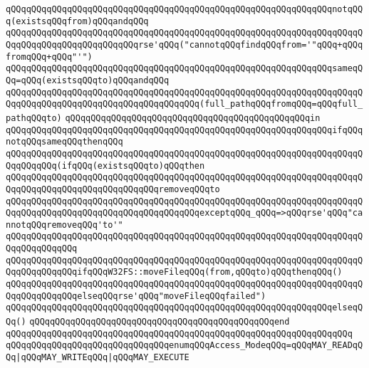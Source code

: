 \verb|qQQqqQQqqQQqqQQqqQQqqQQqqQQqqQQqqQQqqQQqqQQqqQQqqQQqqQQqqQQqqQQqnotqQQq(existsqQQqfrom)qQQqandqQQq|\newline
\verb|qQQqqQQqqQQqqQQqqQQqqQQqqQQqqQQqqQQqqQQqqQQqqQQqqQQqqQQqqQQqqQQqqQQqqQQqqQQqqQQqqQQqqQQqqQQqqQQqrse'qQQq("cannotqQQqfindqQQqfrom='"qQQq+qQQqfromqQQq+qQQq"'")|\newline
\verb|qQQqqQQqqQQqqQQqqQQqqQQqqQQqqQQqqQQqqQQqqQQqqQQqqQQqqQQqqQQqqQQqsameqQQq=qQQq(existsqQQqto)qQQqandqQQq|\newline
\verb|qQQqqQQqqQQqqQQqqQQqqQQqqQQqqQQqqQQqqQQqqQQqqQQqqQQqqQQqqQQqqQQqqQQqqQQqqQQqqQQqqQQqqQQqqQQqqQQqqQQqqQQqqQQq(full_pathqQQqfromqQQq=qQQqfull_pathqQQqto)|\newline
\verb|qQQqqQQqqQQqqQQqqQQqqQQqqQQqqQQqqQQqqQQqqQQqqQQqin|\newline
\verb|qQQqqQQqqQQqqQQqqQQqqQQqqQQqqQQqqQQqqQQqqQQqqQQqqQQqqQQqqQQqqQQqifqQQqnotqQQqsameqQQqthenqQQq|\newline
\verb|qQQqqQQqqQQqqQQqqQQqqQQqqQQqqQQqqQQqqQQqqQQqqQQqqQQqqQQqqQQqqQQqqQQqqQQqqQQqqQQq(ifqQQq(existsqQQqto)qQQqthen|\newline
\verb|qQQqqQQqqQQqqQQqqQQqqQQqqQQqqQQqqQQqqQQqqQQqqQQqqQQqqQQqqQQqqQQqqQQqqQQqqQQqqQQqqQQqqQQqqQQqqQQqqQQqremoveqQQqto|\newline
\verb|qQQqqQQqqQQqqQQqqQQqqQQqqQQqqQQqqQQqqQQqqQQqqQQqqQQqqQQqqQQqqQQqqQQqqQQqqQQqqQQqqQQqqQQqqQQqqQQqqQQqqQQqqQQqexceptqQQq_qQQq=>qQQqrse'qQQq"cannotqQQqremoveqQQq'to'"|\newline
\verb|qQQqqQQqqQQqqQQqqQQqqQQqqQQqqQQqqQQqqQQqqQQqqQQqqQQqqQQqqQQqqQQqqQQqqQQqqQQqqQQqqQQq|\newline
\verb|qQQqqQQqqQQqqQQqqQQqqQQqqQQqqQQqqQQqqQQqqQQqqQQqqQQqqQQqqQQqqQQqqQQqqQQqqQQqqQQqqQQqifqQQqW32FS::moveFileqQQq(from,qQQqto)qQQqthenqQQq()|\newline
\verb|qQQqqQQqqQQqqQQqqQQqqQQqqQQqqQQqqQQqqQQqqQQqqQQqqQQqqQQqqQQqqQQqqQQqqQQqqQQqqQQqqQQqelseqQQqrse'qQQq"moveFileqQQqfailed")|\newline
\verb|qQQqqQQqqQQqqQQqqQQqqQQqqQQqqQQqqQQqqQQqqQQqqQQqqQQqqQQqqQQqqQQqelseqQQq()|\newline
\verb|qQQqqQQqqQQqqQQqqQQqqQQqqQQqqQQqqQQqqQQqqQQqqQQqend|\newline
\verb|qQQqqQQqqQQqqQQqqQQqqQQqqQQqqQQqqQQqqQQqqQQqqQQqqQQqqQQqqQQqqQQqqQQq|\newline
\verb|qQQqqQQqqQQqqQQqqQQqqQQqqQQqqQQqenumqQQqAccess_ModeqQQq=qQQqMAY_READqQQq|\verb#|qQQqMAY_WRITEqQQq|qQQqMAY_EXECUTE#\newline
\newline
